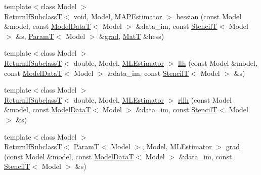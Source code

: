 \begin{DoxyCompactItemize}
\item 
{\footnotesize template$<$class Model $>$ }\\\hyperlink{namespacemappel_a3b77d227658ba3ba9e16fea6fa6e626d}{Return\+If\+SubclassT}$<$ void, Model, \hyperlink{classmappel_1_1MAPEstimator}{M\+A\+P\+Estimator} $>$ \hyperlink{namespacemappel_1_1methods_1_1objective_afbf93fa446606620d01747af3684f62d}{hessian} (const Model \&model, const \hyperlink{namespacemappel_a97f050df953605381ae9c901c3b125f1}{Model\+DataT}$<$ Model $>$ \&data\+\_\+im, const \hyperlink{namespacemappel_a3a06598240007876f8c4bf834ad86197}{StencilT}$<$ Model $>$ \&s, \hyperlink{namespacemappel_a667925cb0d6c0e49f2f035cc5a9a6857}{ParamT}$<$ Model $>$ \&\hyperlink{namespacemappel_1_1methods_1_1objective_a8e120e5a79029803453cea5f9f2d8f67}{grad}, \hyperlink{namespacemappel_a7091ab87c528041f7e2027195fad8915}{MatT} \&hess)
\item 
{\footnotesize template$<$class Model $>$ }\\\hyperlink{namespacemappel_a3b77d227658ba3ba9e16fea6fa6e626d}{Return\+If\+SubclassT}$<$ double, Model, \hyperlink{classmappel_1_1MLEstimator}{M\+L\+Estimator} $>$ \hyperlink{namespacemappel_1_1methods_1_1objective_ac391c37d46e7f85d67947402d85a72ea}{llh} (const Model \&model, const \hyperlink{namespacemappel_a97f050df953605381ae9c901c3b125f1}{Model\+DataT}$<$ Model $>$ \&data\+\_\+im, const \hyperlink{namespacemappel_a3a06598240007876f8c4bf834ad86197}{StencilT}$<$ Model $>$ \&s)
\item 
{\footnotesize template$<$class Model $>$ }\\\hyperlink{namespacemappel_a3b77d227658ba3ba9e16fea6fa6e626d}{Return\+If\+SubclassT}$<$ double, Model, \hyperlink{classmappel_1_1MLEstimator}{M\+L\+Estimator} $>$ \hyperlink{namespacemappel_1_1methods_1_1objective_ab59f42ad9220e14c55b31c04562e691f}{rllh} (const Model \&model, const \hyperlink{namespacemappel_a97f050df953605381ae9c901c3b125f1}{Model\+DataT}$<$ Model $>$ \&data\+\_\+im, const \hyperlink{namespacemappel_a3a06598240007876f8c4bf834ad86197}{StencilT}$<$ Model $>$ \&s)
\item 
{\footnotesize template$<$class Model $>$ }\\\hyperlink{namespacemappel_a3b77d227658ba3ba9e16fea6fa6e626d}{Return\+If\+SubclassT}$<$ \hyperlink{namespacemappel_a667925cb0d6c0e49f2f035cc5a9a6857}{ParamT}$<$ Model $>$, Model, \hyperlink{classmappel_1_1MLEstimator}{M\+L\+Estimator} $>$ \hyperlink{namespacemappel_1_1methods_1_1objective_a2969893932c9440afbb69645a6a31a63}{grad} (const Model \&model, const \hyperlink{namespacemappel_a97f050df953605381ae9c901c3b125f1}{Model\+DataT}$<$ Model $>$ \&data\+\_\+im, const \hyperlink{namespacemappel_a3a06598240007876f8c4bf834ad86197}{StencilT}$<$ Model $>$ \&s)

\end{DoxyCompactItemize}
